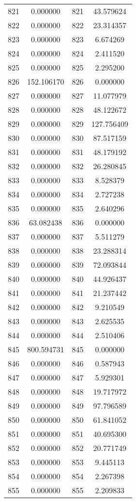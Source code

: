 \documentclass[12pt]{article}
\begin{document}
\begin{longtable}{@{}cccc@{}}
821 & 0.000000 & 821 & 43.579624 \\
822 & 0.000000 & 822 & 23.314357 \\
823 & 0.000000 & 823 & 6.674269 \\
824 & 0.000000 & 824 & 2.411520 \\
825 & 0.000000 & 825 & 2.295200 \\
826 & 152.106170 & 826 & 0.000000 \\
827 & 0.000000 & 827 & 11.077979 \\
828 & 0.000000 & 828 & 48.122672 \\
829 & 0.000000 & 829 & 127.756409 \\
830 & 0.000000 & 830 & 87.517159 \\
831 & 0.000000 & 831 & 48.179192 \\
832 & 0.000000 & 832 & 26.280845 \\
833 & 0.000000 & 833 & 8.528379 \\
834 & 0.000000 & 834 & 2.727238 \\
835 & 0.000000 & 835 & 2.640296 \\
836 & 63.082438 & 836 & 0.000000 \\
837 & 0.000000 & 837 & 5.511279 \\
838 & 0.000000 & 838 & 23.288314 \\
839 & 0.000000 & 839 & 72.093844 \\
840 & 0.000000 & 840 & 44.926437 \\
841 & 0.000000 & 841 & 21.237442 \\
842 & 0.000000 & 842 & 9.210549 \\
843 & 0.000000 & 843 & 2.625535 \\
844 & 0.000000 & 844 & 2.510406 \\
845 & 800.594731 & 845 & 0.000000 \\
846 & 0.000000 & 846 & 0.587943 \\
847 & 0.000000 & 847 & 5.929301 \\
848 & 0.000000 & 848 & 19.717972 \\
849 & 0.000000 & 849 & 97.796589 \\
850 & 0.000000 & 850 & 61.841052 \\
851 & 0.000000 & 851 & 40.695300 \\
852 & 0.000000 & 852 & 20.771749 \\
853 & 0.000000 & 853 & 9.445113 \\
854 & 0.000000 & 854 & 2.267398 \\
855 & 0.000000 & 855 & 2.209833 \\

\end{longtable}
\end{document}
